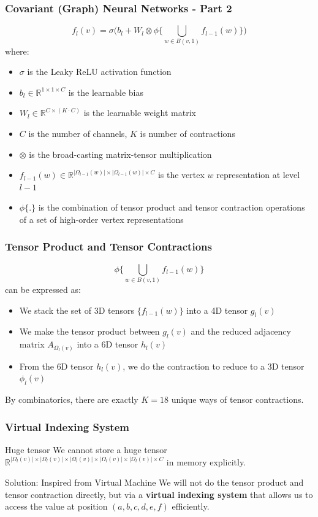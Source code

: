 \documentclass{beamer}
\begin{document}
\begin{frame}
\frametitle{Covariant (Graph) Neural Networks - Part 2}
$$f_l(v) = \sigma \bigg( b_l + W_l \otimes \phi \bigg\{ \bigcup\limits_{w \in B(v, 1)} f_{l - 1}(w) \bigg\} \bigg)$$
where:
\begin{itemize}
	\item $\sigma$ is the Leaky ReLU activation function
	\item $b_l \in \mathbb{R}^{1 \times 1 \times C}$ is the learnable bias
	\item $W_l \in \mathbb{R}^{C \times (K \cdot C)}$ is the learnable weight matrix
	\item $C$ is the number of channels, $K$ is number of contractions
	\item $\otimes$ is the broad-casting matrix-tensor multiplication
	\item $f_{l - 1}(w) \in \mathbb{R}^{|\Omega_{l - 1}(w)| \times |\Omega_{l - 1}(w)| \times C}$ is the vertex $w$ representation at level $l - 1$
	\item $\phi\{.\}$ is the combination of tensor product and tensor contraction operations of a set of high-order vertex representations
\end{itemize}
\end{frame}

\begin{frame}
\frametitle{Tensor Product and Tensor Contractions}
$$\phi \bigg\{ \bigcup\limits_{w \in B(v, 1)} f_{l - 1}(w) \bigg\}$$
can be expressed as:
\begin{itemize}
	\item We stack the set of 3D tensors $\{f_{l - 1}(w)\}$ into a 4D tensor $g_l(v)$
	\item We make the tensor product between $g_l(v)$ and the reduced adjacency matrix $A_{\Omega_l(v)}$ into a 6D tensor $h_l(v)$
	\item From the 6D tensor $h_l(v)$, we do the contraction to reduce to a 3D tensor $\phi_l(v)$
\end{itemize}
By combinatorics, there are exactly $K = 18$ unique ways of tensor contractions.
\end{frame}

\begin{frame}
\frametitle{Virtual Indexing System}
\begin{alertblock}{Huge tensor}
We cannot store a huge tensor $\mathbb{R}^{|\Omega_l(v)| \times |\Omega_l(v)| \times |\Omega_l(v)| \times |\Omega_l(v)| \times |\Omega_l(v)| \times C}$ in memory explicitly.
\end{alertblock}
\begin{block}{Solution: Inspired from Virtual Machine}
We will not do the tensor product and tensor contraction directly, but via a \textbf{virtual indexing system} that allows us to access the value at position $(a, b, c, d, e, f)$ efficiently.
\end{block}
\end{frame}
\end{document}
